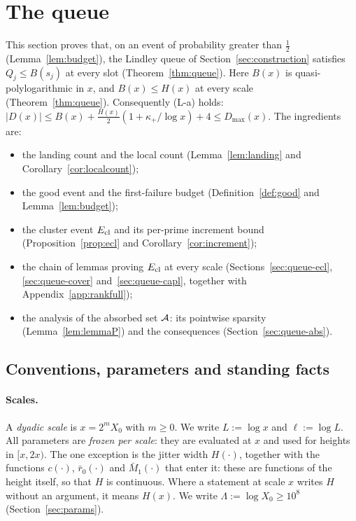 \section{The queue}\label{sec:queue}

This section proves that, on an event of probability greater than $\tfrac12$ (Lemma~\ref{lem:budget}), the Lindley queue of
Section~\ref{sec:construction} satisfies $Q_j\le B(s_j)$ at every slot (Theorem~\ref{thm:queue}). Here $B(x)$ is quasi-polylogarithmic in
$x$, and $B(x)\le H(x)$ at every scale (Theorem~\ref{thm:queue}). Consequently (L-a) holds:
$|D(x)|\le B(x)+\tfrac{H(x)}2(1+\kappa_+/\log x)+4\le D_{\max}(x)$. The ingredients are:
\begin{itemize}
\item the landing count and the local count (Lemma~\ref{lem:landing} and Corollary~\ref{cor:localcount});
\item the good event and the first-failure budget (Definition~\ref{def:good} and Lemma~\ref{lem:budget});
\item the cluster event $E_{\mathrm{cl}}$ and its per-prime increment bound (Proposition~\ref{prop:ecl} and Corollary~\ref{cor:increment});
\item the chain of lemmas proving $E_{\mathrm{cl}}$ at every scale (Sections~\ref{sec:queue-ecl}, \ref{sec:queue-cover} and~\ref{sec:queue-capl}, together
  with Appendix~\ref{app:rankfull});
\item the analysis of the absorbed set $\mathcal{A}$: its pointwise sparsity (Lemma~\ref{lem:lemmaP}) and the consequences
  (Section~\ref{sec:queue-abs}).
\end{itemize}

\subsection{Conventions, parameters and standing facts}\label{sec:queue-conv}\label{sec:queue-standing}

\paragraph{Scales.}
A \emph{dyadic scale} is $x=2^mX_0$ with $m\ge0$. We write $L:=\log x$ and $\ell:=\log L$. All parameters are \emph{frozen per
scale}: they are evaluated at $x$ and used for heights in $[x,2x)$. The one exception is the jitter width $H(\cdot)$,
together with the functions $c(\cdot)$, $\bar r_0(\cdot)$ and $\bar M_1(\cdot)$ that enter it: these are functions of the
height itself, so that $H$ is continuous. Where a statement at scale $x$ writes $H$ without an argument, it means $H(x)$.
We write $\Lambda:=\log X_0\ge10^8$
(Section~\ref{sec:params}).

